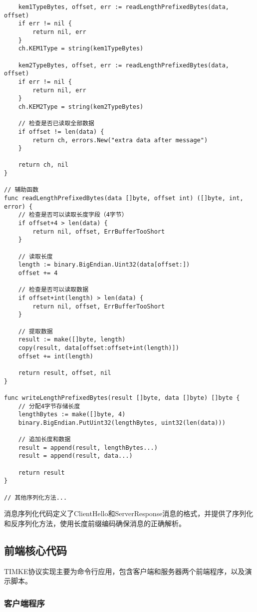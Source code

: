 \begin{verbatim}
    kem1TypeBytes, offset, err := readLengthPrefixedBytes(data, offset)
    if err != nil {
        return nil, err
    }
    ch.KEM1Type = string(kem1TypeBytes)

    kem2TypeBytes, offset, err := readLengthPrefixedBytes(data, offset)
    if err != nil {
        return nil, err
    }
    ch.KEM2Type = string(kem2TypeBytes)

    // 检查是否已读取全部数据
    if offset != len(data) {
        return ch, errors.New("extra data after message")
    }

    return ch, nil
}

// 辅助函数
func readLengthPrefixedBytes(data []byte, offset int) ([]byte, int, error) {
    // 检查是否可以读取长度字段（4字节）
    if offset+4 > len(data) {
        return nil, offset, ErrBufferTooShort
    }

    // 读取长度
    length := binary.BigEndian.Uint32(data[offset:])
    offset += 4

    // 检查是否可以读取数据
    if offset+int(length) > len(data) {
        return nil, offset, ErrBufferTooShort
    }

    // 提取数据
    result := make([]byte, length)
    copy(result, data[offset:offset+int(length)])
    offset += int(length)

    return result, offset, nil
}

func writeLengthPrefixedBytes(result []byte, data []byte) []byte {
    // 分配4字节存储长度
    lengthBytes := make([]byte, 4)
    binary.BigEndian.PutUint32(lengthBytes, uint32(len(data)))

    // 追加长度和数据
    result = append(result, lengthBytes...)
    result = append(result, data...)

    return result
}

// 其他序列化方法...
\end{verbatim}
消息序列化代码定义了ClientHello和ServerResponse消息的格式，并提供了序列化和反序列化方法，使用长度前缀编码确保消息的正确解析。

\subsection{前端核心代码}

TIMKE协议实现主要为命令行应用，包含客户端和服务器两个前端程序，以及演示脚本。

\subsubsection{客户端程序}

